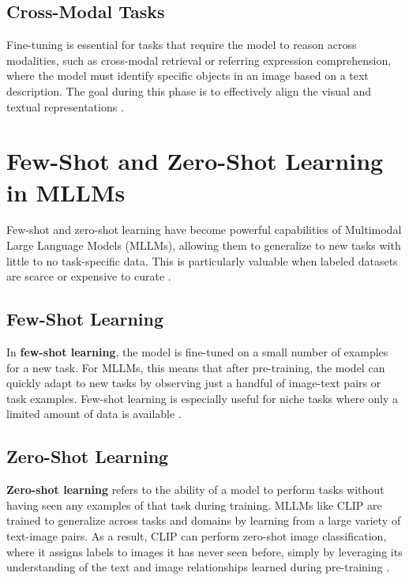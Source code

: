 \subsection{Cross-Modal Tasks}

Fine-tuning is essential for tasks that require the model to reason across modalities, such as cross-modal retrieval or referring expression comprehension, where the model must identify specific objects in an image based on a text description. The goal during this phase is to effectively align the visual and textual representations \cite{CrossModalTasks2024}.

\section{Few-Shot and Zero-Shot Learning in MLLMs}

Few-shot and zero-shot learning have become powerful capabilities of Multimodal Large Language Models (MLLMs), allowing them to generalize to new tasks with little to no task-specific data. This is particularly valuable when labeled datasets are scarce or expensive to curate \cite{FewShotZeroShotLearning2024}.

\subsection{Few-Shot Learning}

In \textbf{few-shot learning}, the model is fine-tuned on a small number of examples for a new task. For MLLMs, this means that after pre-training, the model can quickly adapt to new tasks by observing just a handful of image-text pairs or task examples. Few-shot learning is especially useful for niche tasks where only a limited amount of data is available \cite{FewShotLearning2024}.

\subsection{Zero-Shot Learning}

\textbf{Zero-shot learning} refers to the ability of a model to perform tasks without having seen any examples of that task during training. MLLMs like CLIP are trained to generalize across tasks and domains by learning from a large variety of text-image pairs. As a result, CLIP can perform zero-shot image classification, where it assigns labels to images it has never seen before, simply by leveraging its understanding of the text and image relationships learned during pre-training \cite{ZeroShotLearning2024}.

